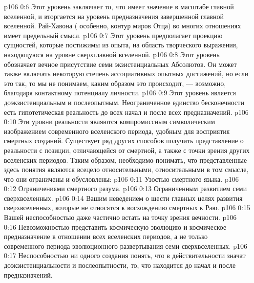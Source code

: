 \vs p106 0:6 \pc {}\bibnobreakspace {} Этот уровень заключает то, что имеет значение в масштабе главной вселенной, и вторгается на уровень предназначения завершенной главной вселенной. Рай\hyp{}Хавона ( особенно, контур миров Отца) во многих отношениях имеет предельный смысл.
\vs p106 0:7 \pc {}\bibnobreakspace {} Этот уровень предполагает проекцию сущностей, которые постижимы из опыта, на область творческого выражения, находящуюся на уровне сверхглавной вселенной.
\vs p106 0:8 \pc {}\bibnobreakspace {} Этот уровень обозначает вечное присутствие семи экзистенциальных Абсолютов. Он может также включать некоторую степень ассоциативных опытных достижений, но если это так, то мы не понимаем, каким образом это происходит, --- возможно, благодаря контактному потенциалу личности.
\vs p106 0:9 \pc {}\bibnobreakspace {} Этот уровень является доэкзистенциальным и послеопытным. Неограниченное единство бесконечности есть гипотетическая реальность до всех начал и после всех предназначений.
\vs p106 0:10 \pc Эти уровни реальности являются компромиссным символическим изображением современного вселенского периода, удобным для восприятия смертных созданий. Существует ряд других способов получить представление о реальности с позиции, отличающейся от смертной, а также с точки зрения других вселенских периодов. Таким образом, необходимо понимать, что представленные здесь понятия являются всецело относительными, относительными в том смысле, что они ограничены и обусловлены:
\vs p106 0:11 \pc {}\bibnobreakspace Узостью смертного языка.
\vs p106 0:12 \pc {}\bibnobreakspace Ограничениями смертного разума.
\vs p106 0:13 \pc {}\bibnobreakspace Ограниченным развитием семи сверхвселенных.
\vs p106 0:14 \pc {}\bibnobreakspace Вашим неведением о шести главных целях развития сверхвселенных, которые не относятся к восхождению смертных к Раю.
\vs p106 0:15 \pc {}\bibnobreakspace Вашей неспособностью даже частично встать на точку зрения вечности.
\vs p106 0:16 \pc {}\bibnobreakspace Невозможностью представить космическую эволюцию и космическое предназначение в отношении всех вселенских периодов, а не только современного периода эволюционного развертывания семи сверхвселенных.
\vs p106 0:17 \pc {}\bibnobreakspace Неспособностью ни одного создания понять, что в действительности значат доэкзистенциальности и послеопытности, то, что находится до начал и после предназначений.

